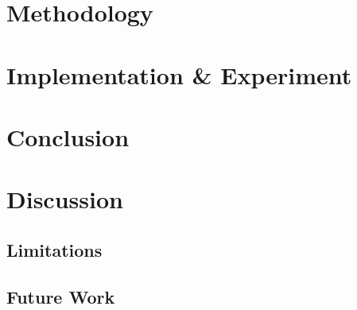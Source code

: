 \documentclass[conference]{IEEEtran}
\begin{document}
\section{Methodology}

\section{Implementation \& Experiment}

\section{Conclusion}

\section{Discussion}
\subsection{Limitations}
\subsection{Future Work} %


\end{document}
